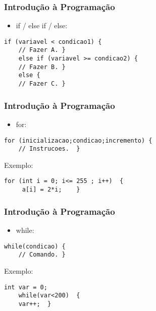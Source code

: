 \documentclass{beamer}
\begin{document}
\begin{frame}[fragile]
\frametitle{Introdução à Programação}
	\begin{itemize}
		\item if / else if / else:
	\end{itemize}
	
	\begin{lstlisting}[style=Arduino]
	if (variavel < condicao1) {
	// Fazer A.	}
	else if (variavel >= condicao2)	{
	// Fazer B.	}
	else {
	// Fazer C.	}	\end{lstlisting}
\end{frame}

\begin{frame}[fragile]
\frametitle{Introdução à Programação}
	\begin{itemize}
		\item for:
	\end{itemize}
	
	\begin{lstlisting}[style=Arduino]
	for (inicializacao;condicao;incremento)	{
	// Instrucoes.	}	\end{lstlisting}
	Exemplo:
	\begin{lstlisting}[style=Arduino]
	for (int i = 0; i<= 255 ; i++)	{
	 a[i] = 2*i;	}	\end{lstlisting}
\end{frame}

\begin{frame}[fragile]
	\frametitle{Introdução à Programação}
	\begin{itemize}
		\item while:
	\end{itemize}
	
	\begin{lstlisting}[style=Arduino]
	while(condicao)	{
	// Comando.	}	\end{lstlisting}
	Exemplo:
	\begin{lstlisting}[style=Arduino]
	int var = 0;
	while(var<200)	{
	var++;	}	\end{lstlisting}
\end{frame}

\end{document}
